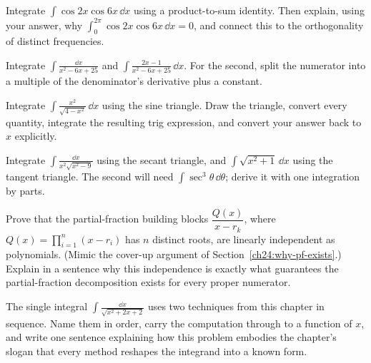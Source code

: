 \begin{exercise}
Integrate $\displaystyle \int \cos 2x\cos 6x\,\dd x$ using a product-to-sum
identity. Then explain, using your answer, why $\int_0^{2\pi}\cos 2x\cos 6x\,
\dd x = 0$, and connect this to the orthogonality of distinct frequencies.
\end{exercise}

\begin{exercise}
Integrate $\displaystyle \int \frac{\dd x}{x^2 - 6x + 25}$ and
$\displaystyle \int \frac{2x - 1}{x^2 - 6x + 25}\,\dd x.$ For the second, split
the numerator into a multiple of the denominator's derivative plus a constant.
\end{exercise}

\begin{exercise}
Integrate $\displaystyle \int \frac{x^2}{\sqrt{4 - x^2}}\,\dd x$ using the
sine triangle. Draw the triangle, convert every quantity, integrate the
resulting trig expression, and convert your answer back to $x$ explicitly.
\end{exercise}

\begin{exercise}
Integrate $\displaystyle \int \frac{\dd x}{x^2\sqrt{x^2 - 9}}$ using the secant
triangle, and $\displaystyle \int \sqrt{x^2 + 1}\,\dd x$ using the tangent
triangle. The second will need $\int \sec^3\theta\,\dd\theta$; derive it with
one integration by parts.
\end{exercise}

\begin{exercise}
Prove that the partial-fraction building blocks $\dfrac{Q(x)}{x - r_k}$, where
$Q(x) = \prod_{i=1}^n (x - r_i)$ has $n$ distinct roots, are linearly
independent as polynomials. (Mimic the cover-up argument of
Section~\ref{ch24:why-pf-exists}.) Explain in a sentence why this independence
is exactly what guarantees the partial-fraction decomposition exists for every
proper numerator.
\end{exercise}

\begin{exercise}[Synthesis]
The single integral $\displaystyle \int \frac{\dd x}{\sqrt{x^2 + 2x + 2}}$ uses
two techniques from this chapter in sequence. Name them in order, carry the
computation through to a function of $x$, and write one sentence explaining how
this problem embodies the chapter's slogan that every method reshapes the
integrand into a known form.
\end{exercise}
